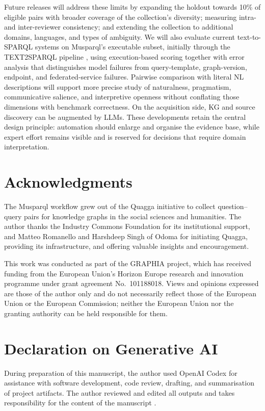 Future releases will address these limits by expanding the holdout towards 10\% of eligible pairs with broader coverage of the collection's diversity; measuring intra- and inter-reviewer consistency; and extending the collection to additional domains, languages, and types of ambiguity. We will also evaluate current text-to-SPARQL systems on Musparql's executable subset, initially through the TEXT2SPARQL pipeline \citep{tramp2025text2sparql}, using execution-based scoring together with error analysis that distinguishes model failures from query-template, graph-version, endpoint, and federated-service failures. Pairwise comparison with literal NL descriptions will support more precise study of naturalness, pragmatism, communicative salience, and interpretive openness without conflating those dimensions with benchmark correctness. On the acquisition side, KG and source discovery can be augmented by LLMs. These developments retain the central design principle: automation should enlarge and organise the evidence base, while expert effort remains visible and is reserved for decisions that require domain interpretation.

\section*{Acknowledgments}\label{acknowledgments}

The Musparql workflow grew out of the Quagga initiative to collect question--query pairs for knowledge graphs in the social sciences and humanities. The author thanks the Industry Commons Foundation for its institutional support, and Matteo Romanello and Harshdeep Singh of Odoma for initiating Quagga, providing its infrastructure, and offering valuable insights and encouragement.

This work was conducted as part of the GRAPHIA project, which has received funding from the European Union's Horizon Europe research and innovation programme under grant agreement No.~101188018. Views and opinions expressed are those of the author only and do not necessarily reflect those of the European Union or the European Commission; neither the European Union nor the granting authority can be held responsible for them.

\section*{Declaration on Generative AI}\label{declaration-on-generative-ai}

During preparation of this manuscript, the author used OpenAI Codex for assistance with software development, code review, drafting, and summarisation of project artifacts. The author reviewed and edited all outputs and takes responsibility for the content of the manuscript \citep{salatino2025ceurpolicy}.
